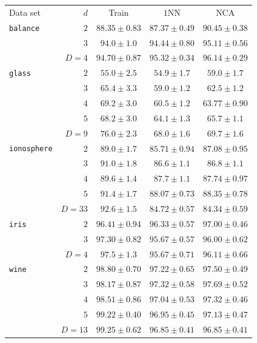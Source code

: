 \begin{table}
  \centering\begin{tabular}{lrccc}
	    \toprule
            	Data set & $d$ & Train & $1$NN & NCA \\
            \cmidrule(r){3-3}\cmidrule(r){4-4} \cmidrule(r){5-5}
             \texttt{balance}&$2$&$88.35 \pm 0.83$&$87.37 \pm 0.49$&$90.45 \pm 0.38$\\ 
&$3$&$94.0 \pm 1.0$&$94.44 \pm 0.80$&$95.11 \pm 0.56$\\ 
&$D=4$&$94.70 \pm 0.87$&$95.32 \pm 0.34$&$96.14 \pm 0.29$\\ 
\midrule
\texttt{glass}&$2$&$55.0 \pm 2.5$&$54.9 \pm 1.7$&$59.0 \pm 1.7$\\ 
&$3$&$65.4 \pm 3.3$&$59.0 \pm 1.2$&$62.5 \pm 1.2$\\ 
&$4$&$69.2 \pm 3.0$&$60.5 \pm 1.2$&$63.77 \pm 0.90$\\ 
&$5$&$68.2 \pm 3.0$&$64.1 \pm 1.3$&$65.7 \pm 1.1$\\ 
&$D=9$&$76.0 \pm 2.3$&$68.0 \pm 1.6$&$69.7 \pm 1.6$\\ 
\midrule
\texttt{ionosphere}&$2$&$89.0 \pm 1.7$&$85.71 \pm 0.94$&$87.08 \pm 0.95$\\ 
&$3$&$91.0 \pm 1.8$&$86.6 \pm 1.1$&$86.8 \pm 1.1$\\ 
&$4$&$89.6 \pm 1.4$&$87.7 \pm 1.1$&$87.74 \pm 0.97$\\ 
&$5$&$91.4 \pm 1.7$&$88.07 \pm 0.73$&$88.35 \pm 0.78$\\ 
&$D=33$&$92.6 \pm 1.5$&$84.72 \pm 0.57$&$84.34 \pm 0.59$\\ 
\midrule
\texttt{iris}&$2$&$96.41 \pm 0.94$&$96.33 \pm 0.57$&$97.00 \pm 0.46$\\ 
&$3$&$97.30 \pm 0.82$&$95.67 \pm 0.57$&$96.00 \pm 0.62$\\ 
&$D=4$&$97.5 \pm 1.3$&$95.67 \pm 0.71$&$96.11 \pm 0.66$\\ 
\midrule
\texttt{wine}&$2$&$98.80 \pm 0.70$&$97.22 \pm 0.65$&$97.50 \pm 0.49$\\ 
&$3$&$98.17 \pm 0.87$&$97.32 \pm 0.58$&$97.69 \pm 0.52$\\ 
&$4$&$98.51 \pm 0.86$&$97.04 \pm 0.53$&$97.32 \pm 0.46$\\ 
&$5$&$99.22 \pm 0.40$&$96.95 \pm 0.45$&$97.13 \pm 0.47$\\ 
&$D=13$&$99.25 \pm 0.62$&$96.85 \pm 0.41$&$96.85 \pm 0.41$\\ 
\bottomrule
     \end{tabular}
\end{table}

